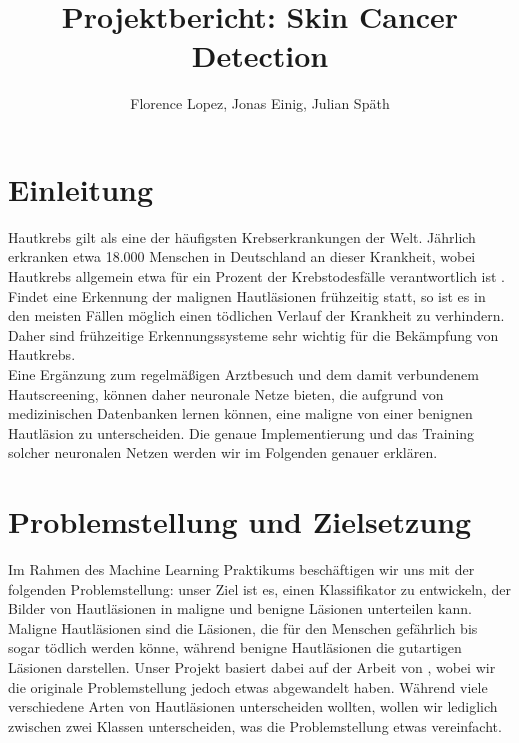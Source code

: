 \documentclass[a4paper, doc]{apa6}
\title{Projektbericht: Skin Cancer Detection}
\author{Florence Lopez, Jonas Einig, Julian Späth }
\affiliation{Department of Computer Science, University of Tübingen}
\begin{document}
\maketitle
\begin{abstract}
    
    \lipsum[1]
\end{abstract}
    
    
\section{Einleitung}

Hautkrebs gilt als eine der häufigsten Krebserkrankungen der Welt. Jährlich erkranken etwa 18.000 Menschen in Deutschland an dieser Krankheit, wobei Hautkrebs allgemein etwa für ein Prozent der Krebstodesfälle verantwortlich ist \citet{hautkrebs}. Findet eine Erkennung der malignen Hautläsionen frühzeitig statt, so ist es in den meisten Fällen möglich einen tödlichen Verlauf der Krankheit zu verhindern. Daher sind frühzeitige Erkennungssysteme sehr wichtig für die Bekämpfung von Hautkrebs.\\
\noindent Eine Ergänzung zum regelmäßigen Arztbesuch und dem damit verbundenem Hautscreening, können daher neuronale Netze bieten, die aufgrund von medizinischen Datenbanken lernen können, eine maligne von einer benignen Hautläsion zu unterscheiden. Die genaue Implementierung und das Training solcher neuronalen Netzen werden wir im Folgenden genauer erklären. 

\section{Problemstellung und Zielsetzung}

Im Rahmen des Machine Learning Praktikums beschäftigen wir uns mit der folgenden Problemstellung: unser Ziel ist es, einen Klassifikator zu entwickeln, der Bilder von Hautläsionen in maligne und benigne Läsionen unterteilen kann. Maligne Hautläsionen sind die Läsionen, die für den Menschen gefährlich bis sogar tödlich werden könne, während benigne Hautläsionen die gutartigen Läsionen darstellen. Unser Projekt basiert dabei auf der Arbeit von \citet{esteva2017dermatologist}, wobei wir die originale Problemstellung jedoch etwas abgewandelt haben. Während \citet{esteva2017dermatologist} viele verschiedene Arten von Hautläsionen unterscheiden wollten, wollen wir lediglich zwischen zwei Klassen unterscheiden, was die Problemstellung etwas vereinfacht.\\
\noindent 
\end{document}
